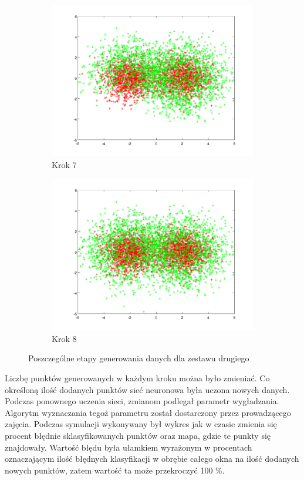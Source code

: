 \documentclass[10pt,a4paper]{article}
\begin{document}
\begin{figure}[H]
   \begin{subfigure}[b]{0.4\textwidth}
    \includegraphics[width=\textwidth]{dataGen2_step6.png}
    \caption{Krok 7}
  \end{subfigure}
  \hfill
  \begin{subfigure}[b]{0.4\textwidth}
    \includegraphics[width=\textwidth]{dataGen2_step7.png}
    \caption{Krok 8}
  \end{subfigure}
  
  \caption{Poszczególne etapy generowania danych dla zestawu drugiego}
  \label{dataGen2}
  
\end{figure}

Liczbę punktów generowanych w każdym kroku można było zmieniać. Co określoną ilość dodanych punktów sieć neuronowa była uczona nowych danych. Podczas ponownego uczenia sieci, zmianom podlegał parametr wygładzania. Algorytm wyznaczania tegoż parametru został dostarczony przez prowadzącego zajęcia. Podczas symulacji wykonywany był wykres jak w czasie zmienia się procent błędnie sklasyfikowanych punktów oraz mapa, gdzie te punkty się znajdowały. Wartość błędu była ułamkiem wyrażonym w procentach oznaczającym ilość błędnych klasyfikacji w obrębie całego okna na ilość dodanych nowych punktów, zatem wartość ta może przekroczyć 100 \%. 
\end{document}
